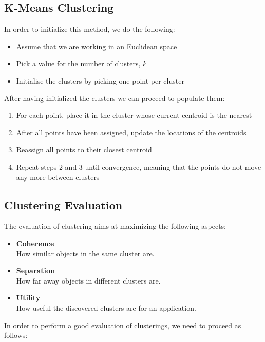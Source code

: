 \documentclass{article}
\begin{document}
\subsection{K-Means Clustering}
In order to initialize this method, we do the following:

\begin{itemize}
	\item Assume that we are working in an Euclidean space
	\item Pick a value for the number of clusters, $k$
	\item Initialise the clusters by picking one point per cluster
\end{itemize}
After having initialized the clusters we can proceed to populate them:

\begin{enumerate}
	\item For each point, place it in the cluster whose current centroid is the nearest
	\item After all points have been assigned, update the locations of the centroids
	\item Reassign all points to their closest centroid
	\item Repeat steps 2 and 3 until convergence, meaning that the points do not move any more between clusters
\end{enumerate}

\subsection{Clustering Evaluation}
The evaluation of clustering aims at maximizing the following aspects:

\begin{itemize}
	\item \textbf{Coherence}
	\vspace{.2cm} \\
	How similar objects in the same cluster are.
	
	\item \textbf{Separation}
	\vspace{.2cm} \\
	How far away objects in different clusters are.
	
	\item \textbf{Utility}
	\vspace{.2cm} \\
	How useful the discovered clusters are for an application.
\end{itemize}
In order to perform a good evaluation of clusterings, we need to proceed as follows:
\end{document}
